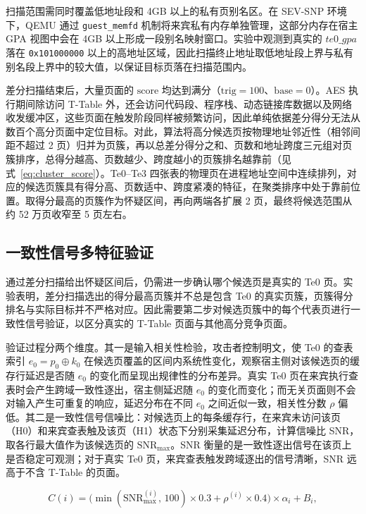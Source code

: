 扫描范围需同时覆盖低地址段和 4GB 以上的私有页别名区。在 SEV-SNP 环境下，QEMU 通过 \texttt{guest\_memfd} 机制将来宾私有内存单独管理，这部分内存在宿主 GPA 视图中会在 4GB 以上形成一段别名映射窗口。实验中观测到真实的 $\mathit{te0\_gpa}$ 落在 \texttt{0x101000000} 以上的高地址区域，因此扫描终止地址取低地址段上界与私有别名段上界中的较大值，以保证目标页落在扫描范围内。

差分扫描结束后，大量页面的 $\mathrm{score}$ 均达到满分（$\mathrm{trig} = 100$、$\mathrm{base} = 0$）。AES 执行期间除访问 T-Table 外，还会访问代码段、程序栈、动态链接库数据以及网络收发缓冲区，这些页面在触发阶段同样被频繁访问，因此单纯依据差分得分无法从数百个高分页面中定位目标。对此，算法将高分候选页按物理地址邻近性（相邻间距不超过 2 页）归并为页簇，再以总差分得分之和、页数和地址跨度三元组对页簇排序，总得分越高、页数越少、跨度越小的页簇排名越靠前（见式~\eqref{eq:cluster_score}）。Te0--Te3 四张表的物理页在进程地址空间中连续排列，对应的候选页簇具有得分高、页数适中、跨度紧凑的特征，在聚类排序中处于靠前位置。取得分最高的页簇作为怀疑区间，再向两端各扩展 2 页，最终将候选范围从约 52 万页收窄至 5 页左右。

\subsection{一致性信号多特征验证}

通过差分扫描给出怀疑区间后，仍需进一步确认哪个候选页是真实的 Te0 页。实验表明，差分扫描选出的得分最高页簇并不总是包含 Te0 的真实页簇，页簇得分排名与实际目标并不严格对应。因此需要第二步对候选页簇中的每个代表页进行一致性信号验证，以区分真实的 T-Table 页面与其他高分竞争页面。

验证过程分两个维度。其一是输入相关性检验，攻击者控制明文，使 Te0 的查表索引 $e_0 = p_0 \oplus k_0$ 在候选页覆盖的区间内系统性变化，观察宿主侧对该候选页的缓存行延迟是否随 $e_0$ 的变化而呈现出规律性的分布差异。真实 Te0 页在来宾执行查表时会产生跨域一致性逐出，宿主侧延迟随 $e_0$ 的变化而变化；而无关页面则不会对输入产生可重复的响应，延迟分布在不同 $e_0$ 之间近似一致，相关性分数 $\rho$ 偏低。其二是一致性信号信噪比：对候选页上的每条缓存行，在来宾未访问该页（H0）和来宾查表触及该页（H1）状态下分别采集延迟分布，计算信噪比 SNR，取各行最大值作为该候选页的 $\mathrm{SNR}_{\max}$。SNR 衡量的是一致性逐出信号在该页上是否稳定可观测；对于真实 Te0 页，来宾查表触发跨域逐出的信号清晰，SNR 远高于不含 T-Table 的页面。

\begin{equation}
  C(i) = \bigl(\min(\mathrm{SNR}_{\max}^{(i)},\, 100) \times 0.3 + \rho^{(i)} \times 0.4\bigr) \times \alpha_i + B_i,
  \label{eq:combined_score}
\end{equation}


